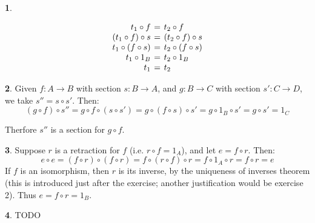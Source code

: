 \documentclass{article}
\theoremstyle{definition}
\theoremstyle{definition}
\theoremstyle{definition}
\newtheorem{solution-internal}{}[subsection]
\newenvironment{solution}{
  \begin{solution-internal}
}{
  \end{solution-internal}
}
\begin{document}
\begin{solution}
$ $\newline
\begin{minipage}{.4\textwidth}
\[ 
\arraycolsep=2pt
\begin{array}{rcl}
  t_1 \circ f &=& t_2 \circ f \\
  (t_1 \circ f) \circ s &=& (t_2 \circ f) \circ s \\
  t_1 \circ (f \circ s) &=& t_2 \circ (f \circ s) \\
  t_1 \circ 1_B &=& t_2 \circ 1_B \\
  t_1 &=& t_2 \\
\end{array}
\]
\end{minipage}%
\begin{minipage}{.4\textwidth}
\end{minipage}%
\end{solution}

\begin{solution}
Given $f\colon A \to B$ with section $s\colon B \to A$, and $g\colon B \to C$ with section $s'\colon C \to D$, we take $s'' = s \circ s'$. Then:
\[ (g \circ f) \circ s'' = g \circ f \circ (s \circ s') = g \circ (f \circ s) \circ s' = g \circ 1_B \circ s' = g \circ s' = 1_C \]

Therfore $s''$ is a section for $g \circ f$.
\end{solution}

\begin{solution}
Suppose $r$ is a retraction for $f$ (i.e. $r \circ f = 1_A$), and let $e = f \circ r$. Then:
\[ e \circ e = (f \circ r) \circ (f \circ r) = f \circ (r \circ f) \circ r = f \circ 1_A \circ r = f \circ r = e \]
If $f$ is an isomorphism, then $r$ is its inverse, by the uniqueness of
inverses theorem (this is introduced just after the exercise; another
justification would be exercise 2). Thus $e = f \circ r = 1_B$.
\end{solution}

\begin{solution}
TODO
\end{solution}
\end{document}
